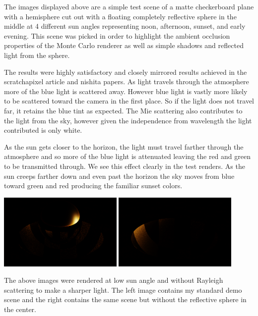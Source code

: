 \documentclass[12pt, letterpaper]{article}
\begin{document}
The images displayed above are a simple test scene of a matte checkerboard plane with
a hemisphere cut out with a floating completely reflective sphere in the middle
at 4 different sun angles representing noon, afternoon, sunset, and early
evening. This scene was picked in order to highlight the ambient occlusion
properties of the Monte Carlo renderer as well as simple shadows and reflected
light from the sphere.

The results were highly satisfactory and closely mirrored results achieved
in the scratchapixel article and nishita papers. As light travels through the
atmosphere more of the blue light is scattered away. However blue light is
vastly more likely to be scattered toward the camera in the first place. So if
the light does not travel far, it retains the blue tint as expected. The Mie
scattering also contributes to the light from the sky, however given the
independence from wavelength the light contributed is only white.

As the sun gets closer to the horizon, the light must travel farther through the
atmosphere and so more of the blue light is attenuated leaving the red and green
to be transmitted through. We see this effect clearly in the test renders. As
the sun creeps farther down and even past the horizon the sky moves from blue
toward green and red producing the familiar sunset colors.

\begin{center}
  \includegraphics[width=0.45\textwidth]{Occlusion}
  \includegraphics[width=0.45\textwidth]{OcclusionNoSphere}
\end{center}

The above images were rendered at low sun angle and without Rayleigh scattering
to make a sharper light. The left image contains my standard demo scene and the
right contains the same scene but without the reflective sphere in the center.
\end{document}
